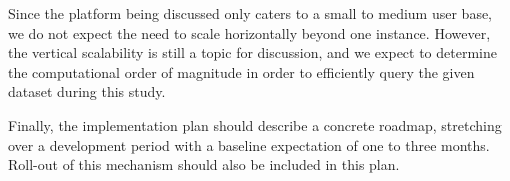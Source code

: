 \documentclass[fleqn,10pt]{voorstel}
\begin{document}
Since the platform being discussed only caters to a small to medium user base, we do not expect the need to scale horizontally beyond one instance. However, the vertical scalability is still a topic for discussion, and we expect to determine the computational order of magnitude in order to efficiently query the given dataset during this study.

Finally, the implementation plan should describe a concrete roadmap, stretching over a development period with a baseline expectation of one to three months. Roll-out of this mechanism should also be included in this plan.


\nocite{KaurRani2013}

\printbibliography[heading=bibintoc]
\end{document}
